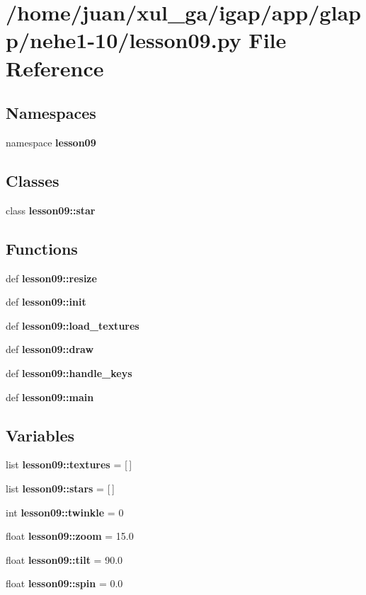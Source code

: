 \section{/home/juan/xul\_\-ga/igap/app/glapp/nehe1-10/lesson09.py File Reference}
\label{nehe1-10_2lesson09_8py}
\subsection*{Namespaces}
\begin{CompactItemize}
\item 
namespace {\bf lesson09}
\end{CompactItemize}
\subsection*{Classes}
\begin{CompactItemize}
\item 
class {\bf lesson09::star}
\end{CompactItemize}
\subsection*{Functions}
\begin{CompactItemize}
\item 
def {\bf lesson09::resize}
\item 
def {\bf lesson09::init}
\item 
def {\bf lesson09::load\_\-textures}
\item 
def {\bf lesson09::draw}
\item 
def {\bf lesson09::handle\_\-keys}
\item 
def {\bf lesson09::main}
\end{CompactItemize}
\subsection*{Variables}
\begin{CompactItemize}
\item 
list {\bf lesson09::textures} = [$\,$]
\item 
list {\bf lesson09::stars} = [$\,$]
\item 
int {\bf lesson09::twinkle} = 0
\item 
float {\bf lesson09::zoom} = 15.0
\item 
float {\bf lesson09::tilt} = 90.0
\item 
float {\bf lesson09::spin} = 0.0
\end{CompactItemize}
